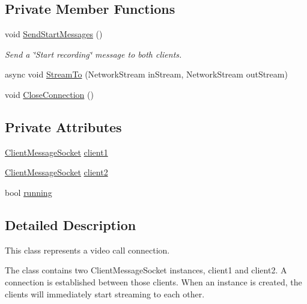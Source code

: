 \subsection*{Private Member Functions}
\begin{DoxyCompactItemize}
\item 
void \hyperlink{class_e_l_i_server_1_1_call_connection_ad458164bca02a4640893be5cda913149}{Send\+Start\+Messages} ()
\begin{DoxyCompactList}\small\item\em Send a \char`\"{}\+Start recording\char`\"{} message to both clients. \end{DoxyCompactList}\item 
async void \hyperlink{class_e_l_i_server_1_1_call_connection_a01514395594e70da5e9acb48d908a238}{Stream\+To} (Network\+Stream in\+Stream, Network\+Stream out\+Stream)
\item 
void \hyperlink{class_e_l_i_server_1_1_call_connection_a58cfbc1878bb29632972ed7c21c580bb}{Close\+Connection} ()
\end{DoxyCompactItemize}
\subsection*{Private Attributes}
\begin{DoxyCompactItemize}
\item 
\hyperlink{class_e_l_i_server_1_1_messaging_1_1_client_message_socket}{Client\+Message\+Socket} \hyperlink{class_e_l_i_server_1_1_call_connection_adfdb5fc52756028eeac454f6e61e9de6}{client1}
\item 
\hyperlink{class_e_l_i_server_1_1_messaging_1_1_client_message_socket}{Client\+Message\+Socket} \hyperlink{class_e_l_i_server_1_1_call_connection_af687483721642ebfcb3eaf00e586c7a1}{client2}
\item 
bool \hyperlink{class_e_l_i_server_1_1_call_connection_a2ea22c08df4058ec3c34aa0deb4d67c3}{running}
\end{DoxyCompactItemize}


\subsection{Detailed Description}


This class represents a video call connection.

The class contains two Client\+Message\+Socket instances, client1 and client2. A connection is established between those clients. When an instance is created, the clients will immediately start streaming to each other. 

